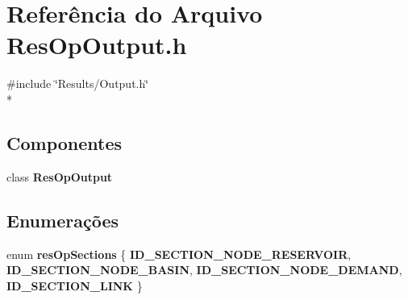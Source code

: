 \section{Referência do Arquivo Res\+Op\+Output.\+h}
\label{_res_op_output_8h}
{\ttfamily \#include \char`\"{}Results/\+Output.\+h\char`\"{}}\\*
\subsection*{Componentes}
\begin{DoxyCompactItemize}
\item 
class {\bf Res\+Op\+Output}
\end{DoxyCompactItemize}
\subsection*{Enumerações}
\begin{DoxyCompactItemize}
\item 
enum {\bf res\+Op\+Sections} \{ {\bf I\+D\+\_\+\+S\+E\+C\+T\+I\+O\+N\+\_\+\+N\+O\+D\+E\+\_\+\+R\+E\+S\+E\+R\+V\+O\+IR}, 
{\bf I\+D\+\_\+\+S\+E\+C\+T\+I\+O\+N\+\_\+\+N\+O\+D\+E\+\_\+\+B\+A\+S\+IN}, 
{\bf I\+D\+\_\+\+S\+E\+C\+T\+I\+O\+N\+\_\+\+N\+O\+D\+E\+\_\+\+D\+E\+M\+A\+ND}, 
{\bf I\+D\+\_\+\+S\+E\+C\+T\+I\+O\+N\+\_\+\+L\+I\+NK}
 \}
\end{DoxyCompactItemize}
